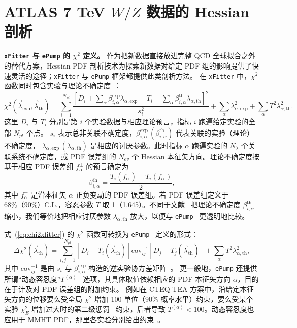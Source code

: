\section{ATLAS 7 TeV $W/Z$ 数据的 Hessian 剖析}
\label{sec:Appendix4xFitter}


{\bf \texttt{xFitter} 与 \texttt{ePump} 的 $\chi^{2}$ 定义。}
作为把新数据直接放进完整 QCD 全球拟合之外的替代方案，Hessian PDF 剖析技术为探索新数据对给定 PDF 组的影响提供了快速灵活的途径；\texttt{xFitter} 与 \texttt{ePump} 框架都提供此类剖析方法。
在 \texttt{xFitter} 中，$\chi^{2}$ 函数同时包含实验与理论不确定度~\cite{Paukkunen:2014zia,Camarda:2015zba,xFmanual}：
\begin{equation}\label{eq:chi2xfitter}
\chi^{2}(\vec{\lambda}_{\textrm{exp}},\vec{\lambda}_{\textrm{th}})=
\sum_{i=1}^{N_{pt}}\frac{\left[D_{i}+\sum_{\alpha}\beta^{\textrm{exp}}_{i,\alpha}\lambda_{\alpha,\textrm{exp}}-
T_i-\sum_{\alpha}\beta_{i,\alpha}^{\textrm{th}}\lambda_{\alpha,\textrm{th}}
\right]^{2}}{s_{i}^{2}}+\sum_{\alpha}\lambda_{\alpha,\textrm{exp}}^{2}+\sum_{\alpha}T^2\lambda_{\alpha,\textrm{th}}^{2}.
\end{equation}
这里 $D_{i}$ 与 $T_i$ 分别是第 $i$ 个实验数据与相应理论预言，指标 $i$ 跑遍给定实验的全部 $N_\mathit{pt}$ 个点。
$s_{i}$ 表示总非关联不确定度，$\beta_{i,\alpha}^{\textrm{exp}}\, (\beta_{i,\alpha}^{\textrm{th}})$ 代表关联的实验（理论）不确定度，
$\lambda_{\alpha,\textrm{exp}}\, (\lambda_{\alpha,\textrm{th}})$ 是相应的讨厌参数。此时指标 $\alpha$ 跑遍实验的 $N_\lambda$ 个关联系统不确定度，或 PDF 误差组的 $N_\mathit{ev}$ 个 Hessian 本征矢方向。理论不确定度按基于相应 PDF 误差组 $f_\alpha^\pm$ 的预言确定为
\begin{equation}
\beta_{i,\alpha}^{\textrm{th}}=\frac{T_i(f_{\alpha}^{+})-T_i(f_{\alpha}^{-})}{2},
\end{equation}
其中 $f_{\alpha}^{\pm}$ 是沿本征矢 $\alpha$ 正负变动的 PDF 误差组。若 PDF 误差组定义于 68\%（90\%）C.L.，容忍参数 $T$ 取 1（1.645）。不同于文献~\cite{xFmanual} 把理论不确定度 $\beta^{\textrm{th}}_{i,\alpha}$ 缩小，我们等价地把相应讨厌参数 $\lambda_{\alpha,\textrm{th}}$ 放大，以便与 \texttt{ePump}~\cite{Schmidt:2018hvu,Hou:2019gfw} 更透明地比较。

式~(\ref{eq:chi2xfitter}) 的 $\chi^{2}$ 函数可转换为 \texttt{ePump}~\cite{Schmidt:2018hvu,Hou:2019gfw} 定义的形式：
\begin{equation}\label{eq:chi2ePump}
\Delta\chi^{2}(\vec{\lambda}_{\textrm{th}})
=\sum_{i,j=1}^{N_\mathit{pt}}
[D_i-T_{i}(\vec{\lambda}_{\textrm{th}})]
\textrm{cov}_{ij}^{-1}[D_j-T_{j}(\vec{\lambda}_{\textrm{th}})]
+\sum_{\alpha}T^2\lambda_{\alpha,\textrm{th}}^{2},
\end{equation}
其中 $\textrm{cov}_{ij}^{-1}$ 是由 $s_i$ 与 $\beta_{i,\alpha}^{\textrm{exp}}$ 构造的逆实验协方差矩阵~\cite{Gao:2013xoa}。
更一般地，\texttt{ePump} 还提供所谓``动态容忍度''$T^{(\alpha)}$~\cite{Schmidt:2018hvu,Hou:2019gfw} 选项，其具体取值依赖相应的 PDF 本征矢方向 $\alpha$，目的在于计及对 PDF 误差组的附加约束。
例如在 CTEQ-TEA 方案中，沿给定本征矢方向的位移要么受全局 $\chi^2$ 增加 100 单位（90\% 概率水平）约束，要么受某个实验 $\chi^2_E$ 增加过大时的第二级惩罚~\cite{Lai:2010vv,Gao:2013xoa} 约束，后者导致 $T^{(\alpha)}<100$。动态容忍度也应用于 MMHT PDF，那里各实验分别给出约束~\cite{Harland-Lang:2014zoa}。


